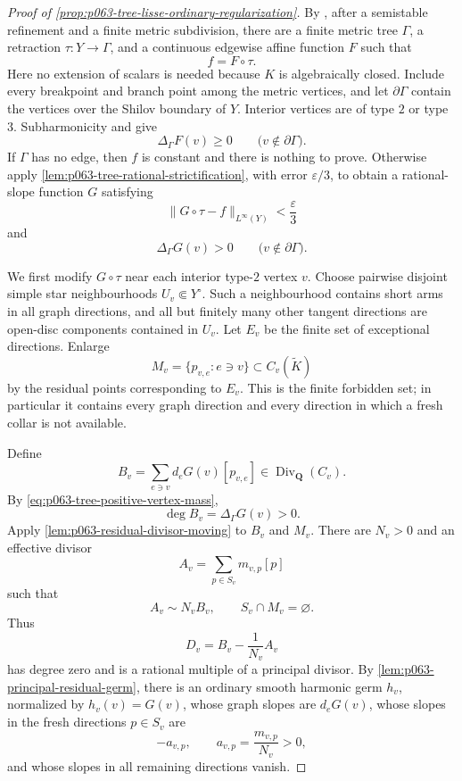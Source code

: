 \begin{proof}[Proof of
\cref{prop:p063-tree-lisse-ordinary-regularization}]
By \cite[Proposition~3.2.4]{Thu05}, after a semistable refinement and a
finite metric subdivision, there are a finite metric tree \(\Gamma\), a
retraction \(\tau:Y\to\Gamma\), and a continuous edgewise affine function
\(F\) such that
\[
                         f=F\circ\tau.
\]
Here no extension of scalars is needed because \(K\) is algebraically
closed.  Include every breakpoint and branch point among the metric
vertices, and let \(\partial\Gamma\) contain the vertices over the Shilov
boundary of \(Y\).  Interior vertices are of type \(2\) or type \(3\).
Subharmonicity and \cite[Proposition~3.4.4]{Thu05} give
\[
                         \Delta_\Gamma F(v)\geq0
                         \qquad
                         \bigl(v\notin\partial\Gamma\bigr).
\]
If \(\Gamma\) has no edge, then \(f\) is constant and there is nothing to
prove.  Otherwise apply
\cref{lem:p063-tree-rational-strictification}, with error
\(\varepsilon/3\), to obtain a rational-slope function \(G\) satisfying
\begin{equation}
\label{eq:p063-tree-graph-error}
 \lVert G\circ\tau-f\rVert_{L^\infty(Y)}
 <\frac{\varepsilon}{3}
\end{equation}
and
\begin{equation}
\label{eq:p063-tree-positive-vertex-mass}
                         \Delta_\Gamma G(v)>0
                         \qquad
                         \bigl(v\notin\partial\Gamma\bigr).
\end{equation}

We first modify \(G\circ\tau\) near each interior type-\(2\) vertex
\(v\).  Choose pairwise disjoint simple star neighbourhoods
\(U_v\Subset Y^\circ\).  Such a neighbourhood contains short arms in all
graph directions, and all but finitely many other tangent directions are
open-disc components contained in \(U_v\).  Let \(E_v\) be the finite set
of exceptional directions.  Enlarge
\[
 M_v=\{p_{v,e}:e\ni v\}\subset C_v(\widetilde K)
\]
by the residual points corresponding to \(E_v\).  This is the finite
forbidden set; in particular it contains every graph direction and every
direction in which a fresh collar is not available.

Define
\[
                         B_v
   =\sum_{e\ni v}d_eG(v)[p_{v,e}]
   \in\operatorname{Div}_{\mathbf Q}(C_v).
\]
By \eqref{eq:p063-tree-positive-vertex-mass},
\[
                         \deg B_v
                         =\Delta_\Gamma G(v)>0.
\]
Apply \cref{lem:p063-residual-divisor-moving} to \(B_v\) and \(M_v\).
There are \(N_v>0\) and an effective divisor
\[
                         A_v=\sum_{p\in S_v}m_{v,p}[p]
\]
such that
\[
 A_v\sim N_vB_v,
 \qquad
 S_v\cap M_v=\varnothing.
\]
Thus
\[
                         D_v
    =B_v-\frac1{N_v}A_v
\]
has degree zero and is a rational multiple of a principal divisor.  By
\cref{lem:p063-principal-residual-germ}, there is an ordinary smooth
harmonic germ \(h_v\), normalized by \(h_v(v)=G(v)\), whose graph slopes
are \(d_eG(v)\), whose slopes in the fresh directions \(p\in S_v\) are
\[
                         -a_{v,p},
             \qquad
                         a_{v,p}=\frac{m_{v,p}}{N_v}>0,
\]
and whose slopes in all remaining directions vanish.


\end{proof}
